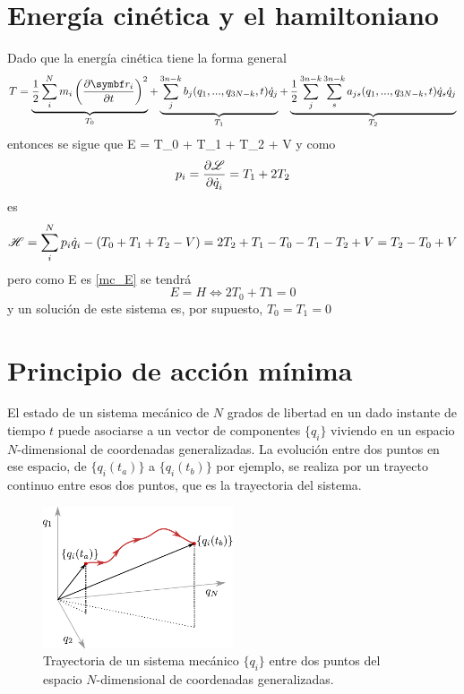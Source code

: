 \documentclass[10pt,oneside]{CBFT_book}
\begin{document}
\section{Energía cinética y el hamiltoniano}

Dado que la energía cinética tiene la forma general
\[
	T = \underbrace{\frac{1}{2} \sum_i^N m_i \left( \dpar{\vb{r}_i}{t} \right)^2}_{T_0}  +
	\underbrace{\sum_j^{3n-k} b_j(q_1,...,q_{3N-k},t)\dot{q}_j  }_{T_1} +
	\underbrace{\frac{1}{2} \sum_j^{3n-k}\sum_s^{3n-k}  a_{js}(q_1,...,q_{3N-k},t)\dot{q}_s\dot{q}_j }_{T_2}
\]
entonces se sigue que 
\be
	E = T_0 + T_1 + T_2 + V
\label{mc_E}
\ee
y como 
\[
	p_i = \frac{\partial^{\hspace{-0.05em}} {\mathscr{L}}}{\partial {\dot{q}_i}^{\hspace{-0.05em}}} = T_1 + 2T_2 
\]
es 
\[
	\mathscr{H} = \sum_i^N p_i\dot{q}_i - (T_0 + T_1 + T_2 - V) = 2T_2 + T_1 - T_0 - T_1 - T_2 + V = T_2 - T_0 + V
\]
pero como E es \eqref{mc_E} se tendrá 
\[
	E = H \iff 2T_0 + T1 = 0
\]
y un solución de este sistema es, por supuesto, $T_0 = T_1 = 0$

\section{Principio de acción mínima}

El estado de un sistema mecánico de $ N $ grados de libertad en un dado instante de tiempo $ t $ puede asociarse a 
un vector de componentes $ \{ q_i \} $ viviendo en un espacio $N$-dimensional de coordenadas generalizadas. 
La evolución entre dos puntos en ese espacio, de $ \{ q_i(t_a) \} $  a $ \{ q_i(t_b) \} $ por ejemplo, se realiza por
un trayecto continuo entre esos dos puntos, que es la trayectoria del sistema.

\begin{figure}[bth]
	\begin{center}
	\includegraphics[width=0.5\textwidth]{images/fig_hamilton.pdf}	 
	\end{center}
	\caption{Trayectoria de un sistema mecánico $\{ q_i \}$ entre dos puntos del espacio $N$-dimensional de
	coordenadas generalizadas.}
	\label{principio_hamilton}
\end{figure}
\end{document}
